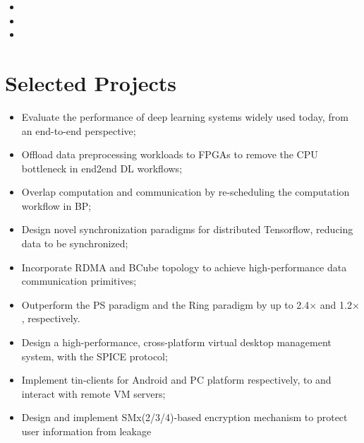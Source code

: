 \documentclass{resume}
\begin{document}
\begin{itemize}
	\item {}
	\item {}	
	\item {}
\end{itemize}


\section{Selected Projects}
\begin{itemize}
	\item Evaluate the performance of deep learning systems widely used today, from an end-to-end perspective;
	\item Offload data preprocessing workloads to FPGAs to remove the CPU bottleneck in end2end DL workflows;
	\item Overlap computation and communication by re-scheduling the computation workflow in BP;
\end{itemize}

\begin{itemize}
	\item Design novel synchronization paradigms for distributed Tensorflow, reducing data to be synchronized;
	\item Incorporate RDMA and BCube topology to achieve high-performance data communication primitives;
	\item Outperform the PS paradigm and the Ring paradigm by up to 2.4$\times$ and 1.2$\times$, respectively.
\end{itemize}

\begin{itemize}
	\item Design a high-performance, cross-platform virtual desktop management system, with the SPICE protocol;
	\item Implement tin-clients for Android and PC platform respectively,  to and interact with remote VM servers;
	\item Design and implement SMx(2/3/4)-based encryption mechanism to protect user information from leakage
\end{itemize}
\end{document}

